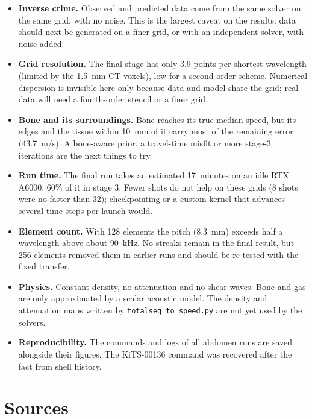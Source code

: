 \documentclass[11pt]{article}
\newcommand{\code}[1]{\texttt{#1}}
\begin{document}
\begin{itemize}
  \item \textbf{Inverse crime.} Observed and predicted data come from the same
    solver on the same grid, with no noise. This is the largest caveat on the
    results: data should next be generated on a finer grid, or with an
    independent solver, with noise added.
  \item \textbf{Grid resolution.} The final stage has only 3.9 points per
    shortest wavelength (limited by the 1.5~mm CT voxels), low for a
    second-order scheme. Numerical dispersion is invisible here only because
    data and model share the grid; real data will need a fourth-order stencil
    or a finer grid.
  \item \textbf{Bone and its surroundings.} Bone reaches its true median speed,
    but its edges and the tissue within 10~mm of it carry most of the remaining
    error (43.7~m/s). A bone-aware prior, a travel-time misfit or more stage-3
    iterations are the next things to try.
  \item \textbf{Run time.} The final run takes an estimated 17~minutes on an
    idle RTX A6000, 60\% of it in stage 3. Fewer shots do not help on these
    grids (8 shots were no faster than 32); checkpointing or a custom kernel
    that advances several time steps per launch would.
  \item \textbf{Element count.} With 128 elements the pitch (8.3~mm) exceeds
    half a wavelength above about 90~kHz. No streaks remain in the final
    result, but 256 elements removed them in earlier runs and should be
    re-tested with the fixed transfer.
  \item \textbf{Physics.} Constant density, no attenuation and no shear waves.
    Bone and gas are only approximated by a scalar acoustic model. The
    density and attenuation maps written by \code{totalseg\_to\_speed.py} are
    not yet used by the solvers.
  \item \textbf{Reproducibility.} The commands and logs of all abdomen runs are
    saved alongside their figures. The KiTS-00136 command was recovered after
    the fact from shell history.
\end{itemize}

\section*{Sources}
\end{document}
